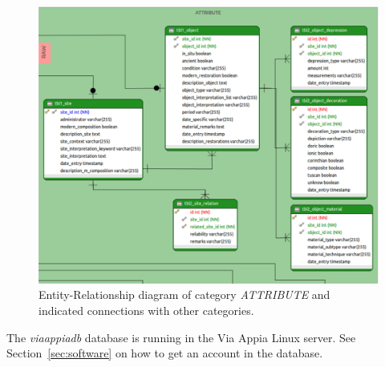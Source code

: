 \begin{figure}[H]
\centering
\includegraphics[scale=0.35]{fig/database/ERDB_ATTRIBUTE_conn.pdf}
\caption{Entity-Relationship diagram of category {\em ATTRIBUTE} and indicated
connections with other categories.}
\label{fig:db_erdb_attribute}
\end{figure}

The \textit{viaappiadb} database is running in the Via Appia Linux server. See
Section~\ref{sec:software} on how to get an account in the database.

